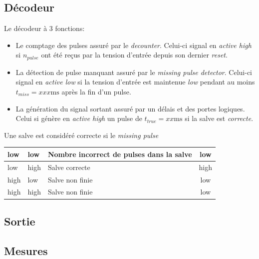 \documentclass[french]{layout/Report}
\begin{document}
\subsection{Décodeur}
Le décodeur à 3 fonctions:
\begin{itemize}
    \item{Le comptage des pulses assuré par le \emph{decounter}. Celui-ci signal en \emph{active high} si $n_{pulse}$ ont été reçus par la tension d'entrée depuis son dernier \emph{reset}.}
    \item{La détection de pulse manquant assuré par le \emph{missing pulse detector}. Celui-ci signal en \emph{active low} si la tension d'entrée est maintenue \emph{low} pendant au moins $t_{miss} = xxx \si{\milli\second}$ après la fin d'un pulse.}
    \item{La génération du signal sortant assuré par un délais et des portes logiques. Celui si génère en \emph{active high} un pulse de $t_{true} = xx\si{\milli\second}$ si la salve est \emph{correcte}.}
\end{itemize}

Une salve est considéré correcte si le \emph{missing pulse }
\begin{center}
    \begin{tabular}{| m{4cm} | m{4cm} | l | c |}
        \hline
        low     & low       & Nombre incorrect de pulses dans la salve & low \\ \hline
        low     & high  & Salve correcte    & high\\ \hline
        high    & low       & Salve non finie & low \\ \hline
        high    & high  & Salve non finie & low \\ \hline
    \end{tabular}
\end{center}

\subsection{Sortie}

\subsection{Mesures}
\end{document}

